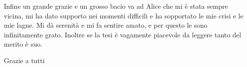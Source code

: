 Infine un grande grazie e un grosso bacio va ad Alice che mi è stata sempre vicina, mi ha dato supporto nei momenti difficili e ha sopportato le mie crisi e le mie lagne. Mi dà serenità e mi fa sentire amato, e per questo le sono infinitamente grato. Inoltre se la tesi è vagamente piacevole da leggere tanto del merito è suo.
\begin{flushright}
	Grazie a tutti
\end{flushright} 